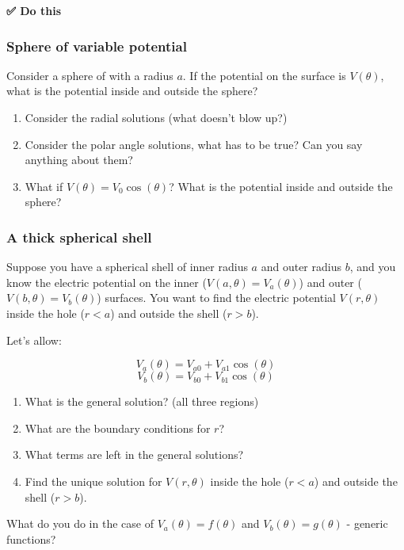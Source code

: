 \textbf{✅ Do this}

\subsubsection{Sphere of variable
potential}\label{sphere-of-variable-potential}

Consider a sphere of with a radius \(a\). If the potential on the
surface is \(V(\theta)\), what is the potential inside and outside the
sphere?

\begin{enumerate}
\def\labelenumi{\arabic{enumi}.}
\tightlist
\item
  Consider the radial solutions (what doesn't blow up?)
\item
  Consider the polar angle solutions, what has to be true? Can you say
  anything about them?
\item
  What if \(V(\theta) = V_0 \cos(\theta)\)? What is the potential inside
  and outside the sphere?
\end{enumerate}

\subsubsection{A thick spherical shell}\label{a-thick-spherical-shell}

Suppose you have a spherical shell of inner radius \(a\) and outer
radius \(b\), and you know the electric potential on the inner
(\(V(a,\theta) = V_a(\theta)\)) and outer
(\(V(b,\theta) = V_b(\theta)\)) surfaces. You want to find the electric
potential \(V(r,\theta)\) inside the hole (\(r<a\)) and outside the
shell (\(r>b\)).

Let's allow:

\[V_a(\theta) = V_{a0} + V_{a1} \cos(\theta)\]
\[V_b(\theta) = V_{b0} + V_{b1} \cos(\theta)\]

\begin{enumerate}
\def\labelenumi{\arabic{enumi}.}
\tightlist
\item
  What is the general solution? (all three regions)
\item
  What are the boundary conditions for \(r\)?
\item
  What terms are left in the general solutions?
\item
  Find the unique solution for \(V(r,\theta)\) inside the hole (\(r<a\))
  and outside the shell (\(r>b\)).
\end{enumerate}

What do you do in the case of \(V_a(\theta) = f(\theta)\) and
\(V_b(\theta) = g(\theta)\) - generic functions?

